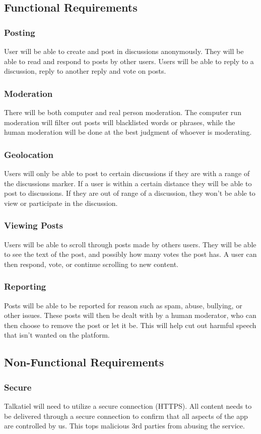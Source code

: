 \documentclass[12pt]{article}
\begin{document}
\subsection{Functional Requirements}
\subsubsection{Posting}
User will be able to create and post in discussions anonymously.  They will be able to read and respond to posts by other users.  Users will be able to reply to a discussion, reply to another reply and vote on posts.
\subsubsection{Moderation}
There will be both computer and real person moderation.  The computer run moderation will filter out posts will blacklisted words or phrases, while the human moderation will be done at the best judgment of whoever is moderating.
\subsubsection{Geolocation}
Users will only be able to post to certain discussions if they are with a range of the discussions marker.  If a user is within a certain distance they will be able to post to discussions.  If they are out of range of a discussion, they won’t be able to view or participate in the discussion.
\subsubsection{Viewing Posts}
Users will be able to scroll through posts made by others users.  They will be able to see the text of the post, and possibly how many votes the post has.  A user can then respond, vote, or continue scrolling to new content.
\subsubsection{Reporting}
Posts will be able to be reported for reason such as spam, abuse, bullying, or other issues.  These posts will then be dealt with by a human moderator, who can then choose to remove the post or let it be.  This will help cut out harmful speech that isn’t wanted on the platform.
\subsection{Non-Functional Requirements}
\subsubsection{Secure}
Talkatiel will need to utilize a secure connection (HTTPS).
All content needs to be delivered through a secure connection to confirm that all aspects of the app are controlled by us.  This tops malicious 3rd parties from abusing the service.
\end{document}
